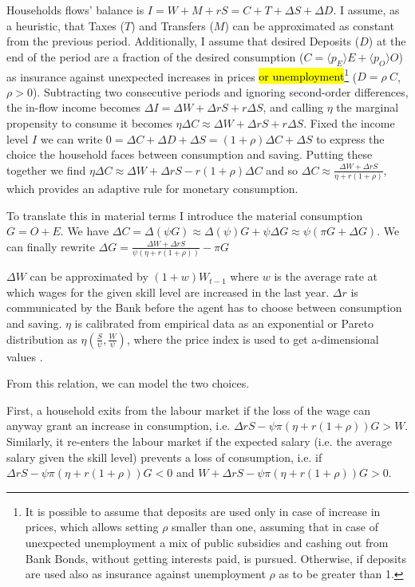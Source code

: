 \documentclass[a4paper, headings=standardclasses]{scrartcl}
\begin{document}
Households flows' balance is $I = W + M + rS = C + T + \Delta S + \Delta D$.
I assume, as a heuristic, that Taxes ($T$) and Transfers ($M$) can be approximated as constant from the previous period.
Additionally, I assume that desired Deposits ($D$) at the end of the period are a fraction of the desired consumption ($C = \langle p_E \rangle E + \langle p_O \rangle O$) as insurance against unexpected increases in prices \hl{or unemployment}\footnote{It is possible to assume that deposits are used only in case of increase in prices, which allows setting $\rho$ smaller than one, assuming that in case of unexpected unemployment a mix of public subsidies and cashing out from Bank Bonds, without getting interests paid, is pursued. Otherwise, if deposits are used also as insurance against unemployment $\rho$ as to be greater than 1.} ($D = \rho~C$, $\rho > 0$).
Subtracting two consecutive periods and ignoring second-order differences, the in-flow income becomes $\Delta I = \Delta W + \Delta r S + r \Delta S$, and calling $\eta$ the marginal propensity to consume it becomes $\eta \Delta C \approx \Delta W + \Delta r S + r \Delta S$.
Fixed the income level $I$ we can write $0 = \Delta C + \Delta D + \Delta S = (1+\rho) \Delta C + \Delta S$ to express the choice the household faces between consumption and saving.
Putting these together we find $\eta \Delta C \approx \Delta W + \Delta r S - r (1+\rho) \Delta C$ and so $\Delta C \approx \frac{\Delta W + \Delta r S}{\eta + r (1+\rho)}$, which provides an adaptive rule for monetary consumption.

To translate this in material terms I introduce the material consumption $G = O + E$. We have $\Delta C = \Delta (\psi G) \approx \Delta(\psi) G + \psi \Delta G \approx \psi (\pi G + \Delta G)$. We can finally rewrite $\Delta G = \frac{\Delta W + \Delta r S}{\psi (\eta + r (1+\rho))} - \pi G$

$\Delta W$ can be approximated by $(1 + w) W_{t-1}$ where $w$ is the average rate at which wages for the given skill level are increased in the last year. $\Delta r$ is communicated by the Bank before the agent has to choose between consumption and saving. $\eta$ is calibrated from empirical data as an exponential or Pareto distribution as $\eta(\frac{S}{\psi},\frac{W}{\psi})$, where the price index is used to get a-dimensional values \parencite{fisher2020,carroll2017}.

From this relation, we can model the two choices.

First, a household exits from the labour market if the loss of the wage can anyway grant an increase in consumption, i.e. $\Delta r S - \psi \pi (\eta + r (1+\rho)) G > W$. Similarly, it re-enters the labour market if the expected salary (i.e. the average salary given the skill level) prevents a loss of consumption, i.e. if $\Delta r S - \psi \pi (\eta + r (1+\rho)) G < 0$ and $W + \Delta r S - \psi \pi (\eta + r (1+\rho)) G > 0$.
\end{document}
